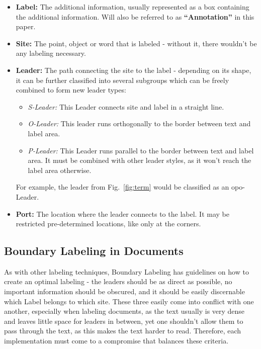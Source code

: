 \documentclass[11pt,a4paper]{article}
\begin{document}
\begin{itemize}
 \item \textbf{Label:} The additional information, usually represented as a box containing the additional information. Will also be referred to as \textbf{``Annotation''} in this paper.
 \item \textbf{Site:} The point, object or word that is labeled - without it, there wouldn't be any labeling necessary.
 \item \textbf{Leader:} The path connecting the site to the label - depending on its shape, it can be further classified into several subgroups which can be freely combined to form new leader types:
  \begin{itemize}
   \item \textit{S-Leader:} This Leader connects site and label in a straight line.
   \item \textit{O-Leader:} This leader runs orthogonally to the border between text and label area.
   \item \textit{P-Leader:} This Leader runs parallel to the border between text and label area. It must be combined with other leader styles, as it won't reach the label area otherwise.
  \end{itemize}
    For example, the leader from Fig.~\ref{fig:term} would be classified as an opo-Leader.
 \item \textbf{Port:} The location where the leader connects to the label. It may be restricted pre-determined locations, like only at the corners.
\end{itemize}

\subsection{Boundary Labeling in Documents}
As with other labeling techniques, Boundary Labeling has guidelines on how to create an optimal labeling - the leaders should be as direct as possible, no important information should be obscured, and it should be easily discernable which Label belongs to which site. These three easily come into conflict with one another, especially when labeling documents, as the text usually is very dense and leaves little space for leaders in between, yet one shouldn't allow them to pass through the text, as this makes the text harder to read. Therefore, each implementation must come to a compromise that balances these criteria.








\end{document}
